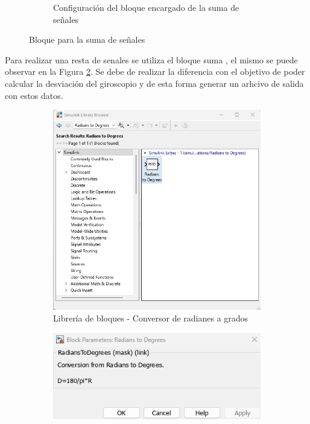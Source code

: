 \begin{figure}[htbp]
\begin{subfigure}[b]{0.45\textwidth}
        \caption{Configuración del bloque encargado de la suma de señales}
        \label{fig:config_add_IMU}
    \end{subfigure}
    \caption{Bloque para la suma de señales}
    \label{fig:add_of_some_signals}
\end{figure}

Para realizar una resta de senales se utiliza el bloque suma , el mismo se puede observar en la Figura \ref{fig:add_of_some_signals}. Se debe de realizar la diferencia con el objetivo de poder calcular la desviación del giroscopio y de esta forma generar un arhcivo de salida con estos datos. 


\begin{figure}[htbp]
    \centering
    \begin{subfigure}[b]{0.35\textwidth}
        \centering
        \includegraphics[width=\textwidth]{fig/Capitulo5/Caso_de_estudio_IMU/Generador_de_salidas/libreria_bloque__rad_2_deg.png}
        \caption{Librería de bloques - Conversor de radianes a grados}
        \label{fig:lib_bloques_R2D}
    \end{subfigure}
    \hfill
    \begin{subfigure}[b]{0.45\textwidth}
        \centering
        \includegraphics[width=\textwidth]{fig/Capitulo5/Caso_de_estudio_IMU//Generador_de_salidas/configuracion_rad_2_deg.png}

\end{subfigure}
\end{figure}
